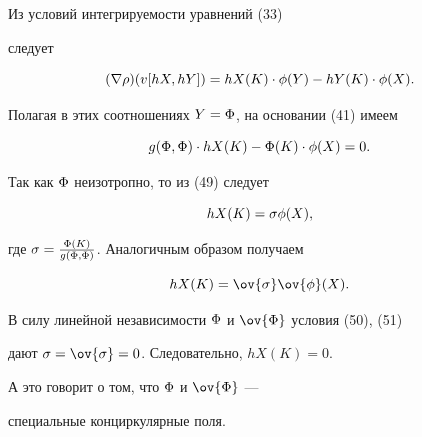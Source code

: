 \begin{pf}


Из условий интегрируемости уравнений (33)


следует


$$


(\nb \ro)(v[hX,hY])={hX}(K)\cdot\f(Y) - {hY}(K)


\cdot\f(X).


$$


Полагая в этих соотношениях $Y=\Phi$, на основании (41) имеем


\begin{equation}


g(\F,\F)\cdot {hX}(K)- {\F}(K)\cdot\f(X)=0.


\end{equation}


Так как $\Phi$ неизотропно, то из (49) следует


\begin{equation}


{hX}(K)=\s\f(X),


\end{equation}


где $\sigma=\frac {{\Phi}(K)}{g(\Phi,\Phi)}$. Аналогичным образом получаем


\begin{equation}


{hX}(K)=\ov{\s}\ov{\f}(X).


\end{equation}


В силу линейной независимости $\Phi$ и $\ov{\F}$ условия (50), (51)


дают $\s=\ov{\s}=0$. Следовательно, $ hX(K)=0$.


А это говорит о том, что $\Phi$ и $\ov{\F}$ ---


специальные конциркулярные поля.


\end{pf}





